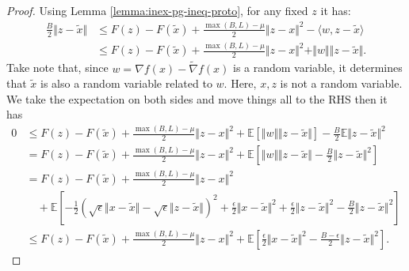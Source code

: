 \documentclass[12pt]{article}
\newcommand{\expect}{\ensuremath{\mathbb E}}
\begin{document}
        \begin{proof}
            Using Lemma \ref{lemma:inex-pg-ineq-proto}, for any fixed $z$ it has: 
            \begin{align*}
                \frac{B}{2}\Vert z - \tilde x\Vert &\le 
                F(z) - F(\tilde x) + \frac{\max(B, L) - \mu}{2}\Vert z - x\Vert^2 - \langle w, z - \tilde x\rangle
                \\
                &\le 
                F(z) - F(\tilde x) + \frac{\max(B, L) - \mu}{2}\Vert z - x\Vert^2 + \Vert w\Vert\Vert z - \tilde x\Vert. 
            \end{align*}
            Take note that, since $w = \nabla f(x) - \tilde \nabla f(x)$ is a random variable, it determines that $\tilde x$ is also a random variable related to $w$. 
            Here, $x, z$ is not a random variable. 
            We take the expectation on both sides and move things all to the RHS then it has 
            \begin{align*}
                0&\le 
                F(z) - F(\tilde x) + \frac{\max(B, L) - \mu}{2}\Vert z - x\Vert^2 
                + \expect\left[
                    \Vert w\Vert\Vert z - \tilde x\Vert
                \right]
                - \frac{B}{2}\expect \Vert z - \tilde x\Vert^2
                \\
                &= 
                F(z) - F(\tilde x) + \frac{\max(B, L) - \mu}{2}\Vert z - x\Vert^2 
                + \expect\left[
                    \Vert w\Vert\Vert z - \tilde x\Vert
                    - \frac{B}{2} \Vert z - \tilde x\Vert^2
                \right]
                \\
                &=
                F(z) - F(\tilde x) + \frac{\max(B, L) - \mu}{2}\Vert z - x\Vert^2 
                    \\ &\quad 
                    + \expect\left[
                        - \frac{1}{2}\left(
                            \sqrt{\epsilon}\Vert x - \tilde x\Vert - \sqrt{\epsilon}\Vert z - \tilde x\Vert
                        \right)^2
                        + \frac{\epsilon}{2}\Vert x - \tilde x\Vert^2 + \frac{\epsilon}{2}\Vert z - \tilde x\Vert^2
                        - \frac{B}{2} \Vert z - \tilde x\Vert^2
                    \right]
                \\
                &\le 
                F(z) - F(\tilde x) + \frac{\max(B, L) - \mu}{2}\Vert z - x\Vert^2 
                + \expect\left[
                    \frac{\epsilon}{2}\Vert x - \tilde x\Vert^2
                    - \frac{B - \epsilon}{2} \Vert z - \tilde x\Vert^2
                \right]. 
            \end{align*}
        \end{proof}
\end{document}
